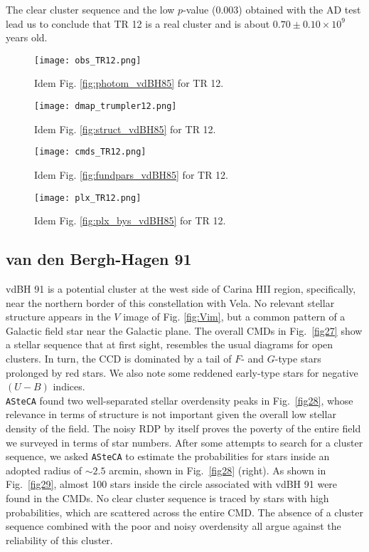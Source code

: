 \documentclass[draft]{aa}
\begin{document}
The clear cluster sequence and the low $p$-value (0.003) obtained with the AD
test lead us to conclude that TR 12 is a real cluster and is about
$0.70\pm0.10\times10^9$ years old.

\begin{figure*}[ht]
    \centering
    \texttt{[image: obs\_TR12.png]}
    \caption{Idem Fig. \ref{fig:photom_vdBH85} for TR 12.}
    \label{fig19}
\end{figure*}
\begin{figure*}[ht]
    \centering
    \texttt{[image: dmap\_trumpler12.png]}
    \caption{Idem Fig. \ref{fig:struct_vdBH85} for TR 12.}
    \label{fig20}
\end{figure*}
\begin{figure*}[ht]
    \centering
    \texttt{[image: cmds\_TR12.png]}
    \caption{Idem Fig. \ref{fig:fundpars_vdBH85} for TR 12.}
    \label{fig21}
\end{figure*}
\begin{figure*}[ht]
    \centering
    \texttt{[image: plx\_TR12.png]}
    \caption{Idem Fig. \ref{fig:plx_bys_vdBH85} for TR 12.}
    \label{fig22}
\end{figure*}



\subsection{van den Bergh-Hagen 91}

vdBH 91 is a potential cluster at the west side of Carina HII
region, specifically, near the northern border of this constellation with Vela.
No relevant stellar structure appears in the $V$ image of Fig. \ref{fig:Vim},
but a common pattern of a Galactic field star near the Galactic plane.
The overall CMDs in Fig.~\ref{fig27} show a stellar sequence that at first
sight, resembles the usual diagrams for open clusters. In turn, the CCD
is dominated by a tail of $F$- and $G$-type stars prolonged by red stars. We also note some reddened early-type stars for negative
$(U-B)$ indices.\\

\texttt{ASteCA} found two well-separated stellar overdensity peaks in
Fig.~\ref{fig28}, whose relevance in terms of structure is not
important given the overall low stellar density of the field.
The noisy RDP by itself proves the poverty of the entire field we surveyed in terms
of star numbers.
After some attempts to search for a cluster sequence, we asked \texttt{ASteCA} to
estimate the probabilities for stars inside an adopted radius
of $\sim2.5$ arcmin, shown in Fig.~\ref{fig28} (right).
As shown in Fig.~\ref{fig29}, almost 100 stars inside the circle
associated with vdBH 91 were found in the CMDs.
No clear cluster sequence is traced by stars with high probabilities, which
are scattered across the entire CMD. The absence of a cluster sequence
combined with the poor and noisy overdensity all argue against the reliability of
this cluster.
\end{document}
